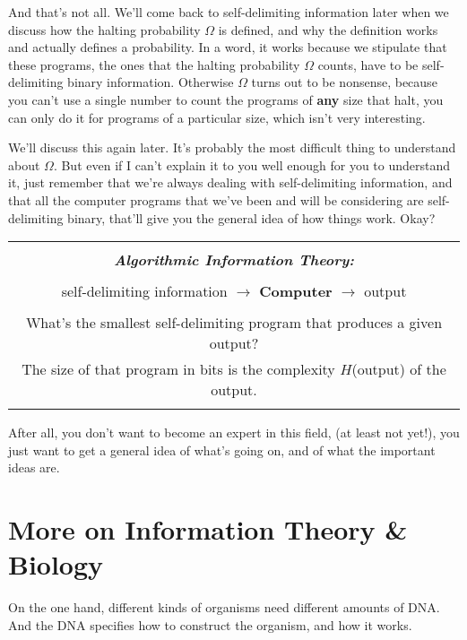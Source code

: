 \documentclass[12pt]{book}
\begin{document}
And that's not all.
We'll come back to self-delimiting information later when we discuss how the halting probability
$\Omega$ is defined, and why the definition works and actually defines a probability.
In a word, it works because we stipulate that these programs, the ones that
the halting probability $\Omega$ counts, have to be self-delimiting binary information.
Otherwise $\Omega$ turns out to be nonsense, because you can't use a single number to count the
programs of \textbf{any} size that halt, you can only do it for programs of a particular size,
which isn't very interesting.
 
We'll discuss this again later.
It's probably the most difficult thing to understand about $\Omega$.
But even if I can't explain it to you well enough for you to understand it, 
just remember that we're always
dealing with self-delimiting information, 
and that all the computer programs that we've been and will be considering are self-delimiting binary,
that'll give you the general idea of how things work.
Okay?
 
\begin{center}
\begin{tabular}{|c|}
\hline
\\
\textbf{\emph{\large Algorithmic Information Theory:}}
\\ \\
self-delimiting information $\longrightarrow$ \textbf{\large Computer} $\longrightarrow$ output 
\\ \\
{\small What's the smallest self-delimiting program that produces a given output?}
\\
{\small The size of that program in bits is the complexity $H$(output) of the output.}
\\
\\
\hline
\end{tabular}
\end{center}
 
After all, you don't want to become an expert in this field, (at least not yet!), you just
want to get a general idea of what's going on, and of what the important ideas are.

\section*{More on Information Theory \& Biology}

On the one hand, different kinds of organisms need different amounts of DNA.
And the DNA specifies how to construct the organism, and how it works.
 
\end{document}
